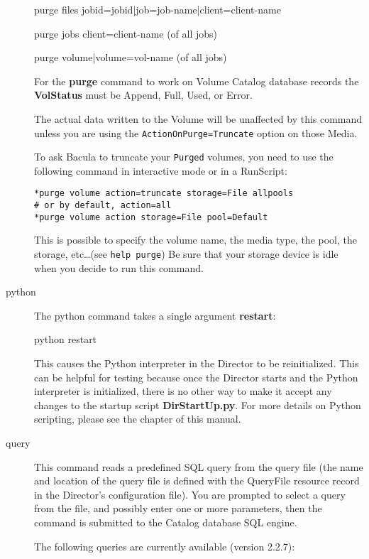 \begin{description}
purge files jobid=\lt{}jobid\gt{}|job=\lt{}job-name\gt{}|client=\lt{}client-name\gt{} 

purge jobs client=\lt{}client-name\gt{} (of all jobs)

purge volume|volume=\lt{}vol-name\gt{} (of all jobs)

For the {\bf purge} command to work on Volume Catalog database  records the
{\bf VolStatus}  must be Append, Full, Used, or Error.  

The actual data written to the Volume will be unaffected by this command unless
you are using the \texttt{ActionOnPurge=Truncate} option on those Media.

To ask Bacula to truncate your \texttt{Purged} volumes, you need to use the
following command in interactive mode or in a RunScript:
\begin{verbatim}
*purge volume action=truncate storage=File allpools
# or by default, action=all
*purge volume action storage=File pool=Default
\end{verbatim}

This is possible to specify the volume name, the media type, the pool, the
storage, etc\dots (see \texttt{help purge}) Be sure that your storage device is
idle when you decide to run this command.

\item[python]
  The python command takes a single argument {\bf restart}:

python restart

   This causes the Python interpreter in the Director to be reinitialized.
   This can be helpful for testing because once the Director starts and the
   Python interpreter is initialized, there is no other way to make it
   accept any changes to the startup script {\bf DirStartUp.py}.  For more
   details on Python scripting, please see the  chapter of this manual.

\item [query]
   This command reads a predefined SQL query from  the query file (the name and
   location of the  query file is defined with the QueryFile resource record in 
   the Director's configuration file). You are prompted to select  a query from
   the file, and possibly enter one or more parameters,  then the command is
   submitted to the Catalog database SQL engine.  

The following queries are currently available (version 2.2.7):  


\end{description}
